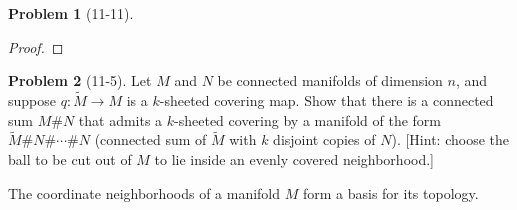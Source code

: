 \documentclass[11pt, a4paper]{article}
\theoremstyle{definition}
\newtheorem{prob}{Problem}
\newenvironment{problem}[1][]{\begin{prob}[#1]\normalfont}{\end{prob}\vspace{1.5em}}
\begin{document}
\begin{problem}[11-11]
\begin{proof}
        

 

    \end{proof}
\end{problem}

\begin{problem}[11-5]
Let $M$ and $N$ be connected manifolds of dimension $n$, and suppose $q: \widetilde{M} \to M$ is a $k$-sheeted covering 
map. Show that there is a connected sum $M \# N$ that admits a $k$-sheeted covering by a manifold of the form 
$\widetilde{M} \# N \# \cdots \# N$ (connected sum of $\widetilde{M}$ with $k$ disjoint copies of $N$). [Hint: choose 
the ball to be cut out of $M$ to lie inside an evenly covered neighborhood.]
    \begin{lemma}
    The coordinate neighborhoods of a manifold $M$ form a basis for its topology.


\end{lemma}
\end{problem}
\end{document}
